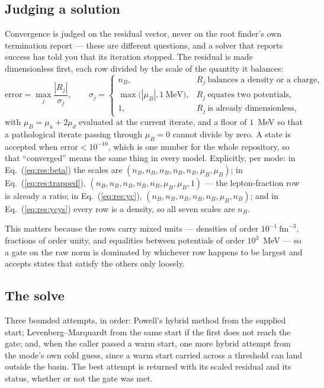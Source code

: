 \documentclass[aps,prc,onecolumn,superscriptaddress,nofootinbib,10pt]{revtex4-2}
\newcommand{\nB}{n_B}
\newcommand{\muB}{\mu_B}
\begin{document}
\subsection{Judging a solution}

Convergence is judged on the residual vector, never on the root finder's own
termination report --- these are different questions, and a solver that
reports success has told you that its iteration stopped. The residual is made
dimensionless first, each row divided by the scale of the quantity it
balances:
%
\begin{equation}
\text{error} = \max_j \frac{|R_j|}{\sigma_j} ,
\qquad
\sigma_j = \begin{cases}
  \nB , & R_j \ \text{balances a density or a charge} , \\
  \max\big(|\muB|, 1\ \mathrm{MeV}\big) ,
        & R_j \ \text{equates two potentials} , \\
  1 , & R_j \ \text{is already dimensionless} ,
\end{cases}
\label{eq:scales}
\end{equation}
%
with $\muB = \mu_u + 2\mu_d$ evaluated at the current iterate, and a floor of
$1$~MeV so that a pathological iterate passing through $\muB = 0$ cannot
divide by zero. A state is accepted when $\text{error} < 10^{-10}$, which is
one number for the whole repository, so that ``converged'' means the same
thing in every model. Explicitly, per mode: in
Eq.~(\ref{eq:res:beta}) the scales are $(\nB,\nB,\nB,\nB,\nB,\muB,\muB)$; in
Eq.~(\ref{eq:res:trapped}), $(\nB,\nB,\nB,\nB,\nB,\muB,\muB,1)$ --- the
lepton-fraction row is already a ratio; in Eq.~(\ref{eq:res:yc}),
$(\nB,\nB,\nB,\nB,\nB,\muB,\nB)$; and in Eq.~(\ref{eq:res:ycys}) every row is
a density, so all seven scales are $\nB$.

This matters because the rows carry mixed units --- densities of order
$10^{-1}\ \mathrm{fm}^{-3}$, fractions of order unity, and equalities between
potentials of order $10^{3}$~MeV --- so a gate on the raw norm is dominated by
whichever row happens to be largest and accepts states that satisfy the others
only loosely.

\subsection{The solve}

Three bounded attempts, in order: Powell's hybrid method from the supplied
start; Levenberg--Marquardt from the same start if the first does not reach
the gate; and, when the caller passed a warm start, one more hybrid attempt
from the mode's own cold guess, since a warm start carried across a threshold
can land outside the basin. The best attempt is returned with its scaled
residual and its status, whether or not the gate was met.
\end{document}
